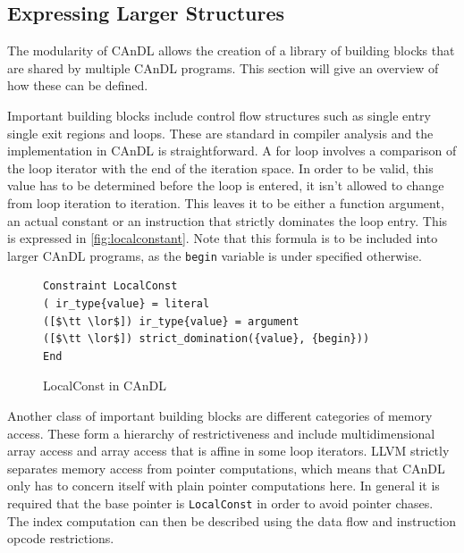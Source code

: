\subsection{Expressing Larger Structures}

    The modularity of CAnDL allows the creation of a library of building blocks
    that are shared by multiple CAnDL programs.
    This section will give an overview of how these can be defined.

    Important building blocks include control flow structures such as single
    entry single exit regions and loops.
    These are standard in compiler analysis and the implementation in CAnDL is
    straightforward.
    A for loop involves a comparison of the loop iterator with the end of the
    iteration space.
    In order to be valid, this value has to be determined before the loop is
    entered, it isn't allowed to change from loop iteration to iteration.
    This leaves it to be either a function argument, an actual constant or an
    instruction that strictly dominates the loop entry.
    This is expressed in \autoref{fig:localconstant}.
    Note that this formula is to be included into larger CAnDL programs, as the
    \texttt{begin} variable is under specified otherwise.

\begin{figure}[ht]
\begin{lstlisting}[language=CAnDL]
Constraint LocalConst
( ir_type{value} = literal
([$\tt \lor$]) ir_type{value} = argument
([$\tt \lor$]) strict_domination({value}, {begin}))
End
\end{lstlisting}
\vspace{-0.3cm}
\caption{LocalConst in CAnDL}
\label{fig:localconstant}
\end{figure}

    Another class of important building blocks are different categories of
    memory access.
    These form a hierarchy of restrictiveness and include multidimensional array
    access and array access that is affine in some loop iterators.
    LLVM strictly separates memory access from pointer computations, which means
    that CAnDL only has to concern itself with plain pointer computations here.
    In general it is required that the base pointer is \texttt{LocalConst} in
    order to avoid pointer chases.
    The index computation can then be described using the data flow and
    instruction opcode restrictions.

